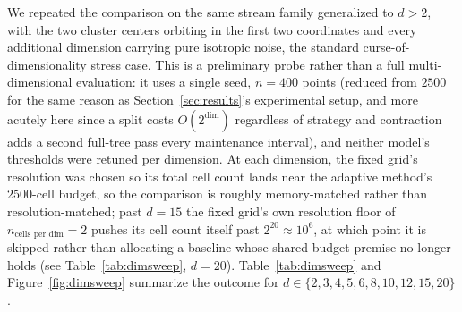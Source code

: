 \documentclass[11pt]{article}
\begin{document}
We repeated the comparison on the same stream family generalized to $d > 2$, with the two cluster centers orbiting in the first two coordinates and every additional dimension carrying pure isotropic noise, the standard curse-of-dimensionality stress case. This is a preliminary probe rather than a full multi-dimensional evaluation: it uses a single seed, $n = 400$ points (reduced from $2500$ for the same reason as Section~\ref{sec:results}'s experimental setup, and more acutely here since a split costs $O(2^{\dim})$ regardless of strategy and contraction adds a second full-tree pass every maintenance interval), and neither model's thresholds were retuned per dimension. At each dimension, the fixed grid's resolution was chosen so its total cell count lands near the adaptive method's $2500$-cell budget, so the comparison is roughly memory-matched rather than resolution-matched; past $d=15$ the fixed grid's own resolution floor of $n_{\text{cells per dim}}=2$ pushes its cell count itself past $2^{20}\approx 10^6$, at which point it is skipped rather than allocating a baseline whose shared-budget premise no longer holds (see Table~\ref{tab:dimsweep}, $d=20$). Table~\ref{tab:dimsweep} and Figure~\ref{fig:dimsweep} summarize the outcome for $d \in \{2,3,4,5,6,8,10,12,15,20\}$.
\end{document}

